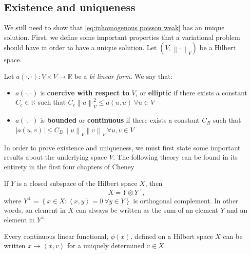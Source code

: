 \documentclass[../Main/main.tex]{subfiles}
\begin{document}
	\subsection{Existence and uniqueness}

	We still need to show that \eqref{eq:inhomogenous poisson weak} has an unique solution.
	First, we define some important properties that a variational problem should have in order to have a unique solution. Let $(V,\left \| \cdot \right \|_V)$ be a Hilbert space.
	\begin{definition} Let $a(\cdot,\cdot):V\times V \rightarrow \mathbb{R}$ be a \emph{bi linear form}. We say that:
			\begin{itemize}
			\item $a(\cdot,\cdot)$ is \textbf{coercive with respect to }$V$, or \textbf{elliptic} if there exists a constant $C_c\in \mathbb{R}$ such that $C_c\left \| u \right \|_V^2 \leq a(u,u) \ \forall u \in V$
			\item $a(\cdot,\cdot)$ is \textbf{bounded} or \textbf{continuous} if there exists a constant $C_B$ such that $|a(u,v)|\leq C_B\left \| u \right \|_V\left \| v \right \|_V \ \forall u,v \in V$
			\end{itemize}
	\end{definition}
	In order to prove existence and uniqueness, we must first state some important results about the underlying space $V$. The following theory can be found in its entirety in the first four chapters of Cheney \cite{Cheney}
	\begin{theorem}\label{th:decomposition of hilbert}
		If $Y$ is a closed subspace of the Hilbert space $X$, then 
		\begin{equation*}
		X = Y\otimes Y^{\bot},
		\end{equation*}		
		where $Y^{\bot} = \left \{ \left. x\in X: \left \langle x,y \right \rangle=0 \ \forall y \in Y \right \} \right.$ is orthogonal complement. In other words, an element in $X$ can always be written as the sum of an element $Y$ and an element in $Y^{\bot}$.
	\end{theorem}
	\begin{theorem}\label{th:riesz representation}
		Every continuous linear functional, $\phi (x)$, defined on a Hilbert space $X$ can be written $x\rightarrow \left \langle x,v \right \rangle$ for a uniquely determined $v \in X$.
	\end{theorem}
\end{document}
